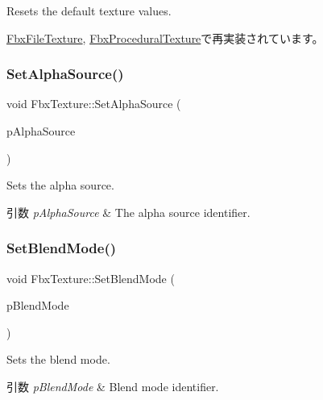 Resets the default texture values. 

\hyperlink{class_fbx_file_texture_acc5d7a39640e4f7f0923c1620c473cb6}{Fbx\+File\+Texture}, \hyperlink{class_fbx_procedural_texture_ad98e91a632bfbd9f29ee537cbe4ff180}{Fbx\+Procedural\+Texture}で再実装されています。

\mbox{\label{class_fbx_texture_a45bc6bb0c52b4eea53a4bc1c9c3a699c}} 
\subsubsection{\texorpdfstring{Set\+Alpha\+Source()}{SetAlphaSource()}}
{\footnotesize\ttfamily void Fbx\+Texture\+::\+Set\+Alpha\+Source (\begin{DoxyParamCaption}\item[{\hyperlink{class_fbx_texture_a12777ea406718d186e21b9656716171d}{E\+Alpha\+Source}}]{p\+Alpha\+Source }\end{DoxyParamCaption})}

Sets the alpha source. 
\begin{DoxyParams}{引数}
{\em p\+Alpha\+Source} & The alpha source identifier. \\
\hline
\end{DoxyParams}
\mbox{\label{class_fbx_texture_a8809f20ef579aea161142784dc671ec9}} 
\subsubsection{\texorpdfstring{Set\+Blend\+Mode()}{SetBlendMode()}}
{\footnotesize\ttfamily void Fbx\+Texture\+::\+Set\+Blend\+Mode (\begin{DoxyParamCaption}\item[{\hyperlink{class_fbx_texture_af1e8597086589ba6b8ba0066d47b6b63}{E\+Blend\+Mode}}]{p\+Blend\+Mode }\end{DoxyParamCaption})}

Sets the blend mode. 
\begin{DoxyParams}{引数}
{\em p\+Blend\+Mode} & Blend mode identifier. \\
\hline
\end{DoxyParams}
\mbox{\label{class_fbx_texture_a8466d23b8049dca1175c24ca4e209f47}} 
